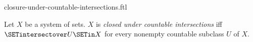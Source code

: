 \documentclass{stex}
\begin{document}
\begin{smodule}{closure-under-countable-intersections.ftl}

\begin{definition}[forthel,id=FOUNDATIONS_14_451771879129088]
  Let $X$ be a system of sets.
  $X$ is \emph{closed under countable intersections} iff $\SETintersectover U \SETin X$ for every nonempty countable subclass $U$ of $X$.
\end{definition}
\end{smodule}
\end{document}
